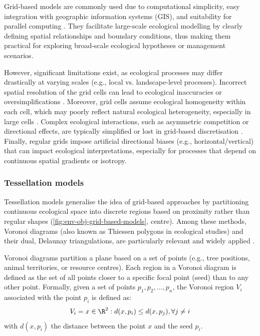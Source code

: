 Grid-based models are commonly used due to computational simplicity, easy integration with geographic information systems (GIS), and suitability for parallel computing \cite{Czaran1998,Nelson2012}. They facilitate large-scale ecological modelling by clearly defining spatial relationships and boundary conditions, thus making them practical for exploring broad-scale ecological hypotheses or management scenarios.

However, significant limitations exist, as ecological processes may differ drastically at varying scales (e.g., local vs. landscape-level processes). Incorrect spatial resolution of the grid cells can lead to ecological inaccuracies or oversimplifications \cite{Wiens1989}. Moreover, grid cells assume ecological homogeneity within each cell, which may poorly reflect natural ecological heterogeneity, especially in large cells \cite{Levin1992}. Complex ecological interactions, such as asymmetric competition or directional effects, are typically simplified or lost in grid-based discretisation \cite{Durrett1994}. Finally, regular grids impose artificial directional biases (e.g., horizontal/vertical) that can impact ecological interpretations, especially for processes that depend on continuous spatial gradients or isotropy.

\subsubsection{Tessellation models}

Tessellation models generalise the idea of grid-based approaches by partitioning continuous ecological space into discrete regions based on proximity rather than regular shapes (\cref{fig:env-obj-grid-based-models}, centre). Among these methods, Voronoi diagrams (also known as Thiessen polygons in ecological studies) and their dual, Delaunay triangulations, are particularly relevant and widely applied \cite{Lemiere2023,Foltete2019,Minor2008}.

Voronoi diagrams partition a plane based on a set of points (e.g., tree positions, animal territories, or resource centres). Each region in a Voronoi diagram is defined as the set of all points closer to a specific focal point (seed) than to any other point. Formally, given a set of points ${p_1, p_2, ..., p_n}$, the Voronoi region $V_i$ associated with the point $p_i$ is defined as:
\begin{align}
    V_i = { x \in \R^2 : d(x, p_i) \leq d(x, p_j), \forall j \neq i }
\end{align}
with $d(x, p_i)$ the distance between the point $x$ and the seed $p_i$.

